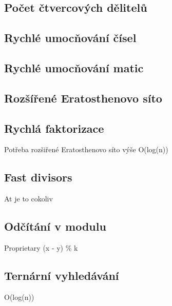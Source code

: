 \documentclass[10pt, a4paper]{article}
\begin{document}
\subsection{Počet čtvercových dělitelů}


\subsection{Rychlé umocňování čísel}



\subsection{Rychlé umocňování matic}


\subsection{Rozšířené Eratosthenovo síto}


\subsection{Rychlá faktorizace}
Potřeba rozšiřené Eratosthenovo síto výše
O(log(n))


\subsection{Fast divisors}
At je to cokoliv


\subsection{Odčítání v modulu}
Proprietary (x - y) \% k


\subsection{Ternární vyhledávání}
O(log(n))


\newpage
\end{document}
